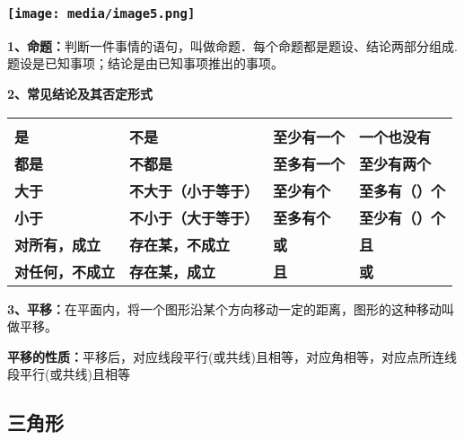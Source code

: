 \documentclass[a4paper,11pt,UTF8]{ctexart}
\begin{document}
\hypertarget{ux5b66ux79d1ux7f51www.zxxk.com--ux6559ux80b2ux8d44ux6e90ux95e8ux6237ux63d0ux4f9bux8bd5ux9898ux8bd5ux5377ux6559ux6848ux8bfeux4ef6ux6559ux5b66ux8bbaux6587ux7d20ux6750ux7b49ux5404ux7c7bux6559ux5b66ux8d44ux6e90ux5e93ux4e0bux8f7dux8fd8ux6709ux5927ux91cfux4e30ux5bccux7684ux6559ux5b66ux8d44ux8baf-7}{%
\subsubsection{\texorpdfstring{\protect\texttt{[image: media/image5.png]}}{学科网(www.zxxk.com)-\/-教育资源门户，提供试题试卷、教案、课件、教学论文、素材等各类教学资源库下载，还有大量丰富的教学资讯！}}\label{ux5b66ux79d1ux7f51www.zxxk.com--ux6559ux80b2ux8d44ux6e90ux95e8ux6237ux63d0ux4f9bux8bd5ux9898ux8bd5ux5377ux6559ux6848ux8bfeux4ef6ux6559ux5b66ux8bbaux6587ux7d20ux6750ux7b49ux5404ux7c7bux6559ux5b66ux8d44ux6e90ux5e93ux4e0bux8f7dux8fd8ux6709ux5927ux91cfux4e30ux5bccux7684ux6559ux5b66ux8d44ux8baf-7}}

\textbf{1、命题：}判断一件事情的语句，叫做命题．每个命题都是题设、结论两部分组成.题设是已知事项；结论是由已知事项推出的事项。

\textbf{2、常见结论及其否定形式}

\begin{longtable}[]{@{}llll@{}}
\toprule
\endhead
& & &\tabularnewline
\textbf{是} & \textbf{不是} & \textbf{至少有一个} &
\textbf{一个也没有}\tabularnewline
\textbf{都是} & \textbf{不都是} & \textbf{至多有一个} &
\textbf{至少有两个}\tabularnewline
\textbf{大于} & \textbf{不大于（小于等于）} & \textbf{至少有个} &
\textbf{至多有（）个}\tabularnewline
\textbf{小于} & \textbf{不小于（大于等于）} & \textbf{至多有个} &
\textbf{至少有（）个}\tabularnewline
\textbf{对所有，成立} & \textbf{存在某，不成立} & \textbf{或} &
\textbf{且}\tabularnewline
\textbf{对任何，不成立} & \textbf{存在某，成立} & \textbf{且} &
\textbf{或}\tabularnewline
\bottomrule
\end{longtable}

\textbf{3、平移：}在平面内，将一个图形沿某个方向移动一定的距离，图形的这种移动叫做平移。

\textbf{平移的性质：}平移后，对应线段平行(或共线)且相等，对应角相等，对应点所连线段平行(或共线)且相等

\hypertarget{ux4e09ux89d2ux5f62}{%
\subsection{\texorpdfstring{
三角形}{ 三角形}}\label{ux4e09ux89d2ux5f62}}
\end{document}

